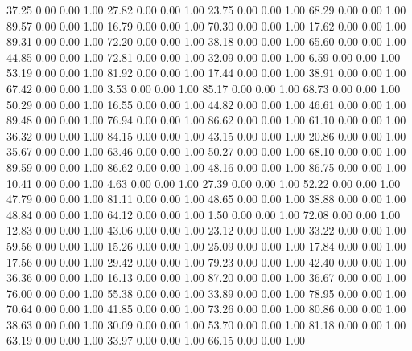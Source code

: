   37.25   0.00   0.00   1.00
   27.82   0.00   0.00   1.00
   23.75   0.00   0.00   1.00
   68.29   0.00   0.00   1.00
   89.57   0.00   0.00   1.00
   16.79   0.00   0.00   1.00
   70.30   0.00   0.00   1.00
   17.62   0.00   0.00   1.00
   89.31   0.00   0.00   1.00
   72.20   0.00   0.00   1.00
   38.18   0.00   0.00   1.00
   65.60   0.00   0.00   1.00
   44.85   0.00   0.00   1.00
   72.81   0.00   0.00   1.00
   32.09   0.00   0.00   1.00
    6.59   0.00   0.00   1.00
   53.19   0.00   0.00   1.00
   81.92   0.00   0.00   1.00
   17.44   0.00   0.00   1.00
   38.91   0.00   0.00   1.00
   67.42   0.00   0.00   1.00
    3.53   0.00   0.00   1.00
   85.17   0.00   0.00   1.00
   68.73   0.00   0.00   1.00
   50.29   0.00   0.00   1.00
   16.55   0.00   0.00   1.00
   44.82   0.00   0.00   1.00
   46.61   0.00   0.00   1.00
   89.48   0.00   0.00   1.00
   76.94   0.00   0.00   1.00
   86.62   0.00   0.00   1.00
   61.10   0.00   0.00   1.00
   36.32   0.00   0.00   1.00
   84.15   0.00   0.00   1.00
   43.15   0.00   0.00   1.00
   20.86   0.00   0.00   1.00
   35.67   0.00   0.00   1.00
   63.46   0.00   0.00   1.00
   50.27   0.00   0.00   1.00
   68.10   0.00   0.00   1.00
   89.59   0.00   0.00   1.00
   86.62   0.00   0.00   1.00
   48.16   0.00   0.00   1.00
   86.75   0.00   0.00   1.00
   10.41   0.00   0.00   1.00
    4.63   0.00   0.00   1.00
   27.39   0.00   0.00   1.00
   52.22   0.00   0.00   1.00
   47.79   0.00   0.00   1.00
   81.11   0.00   0.00   1.00
   48.65   0.00   0.00   1.00
   38.88   0.00   0.00   1.00
   48.84   0.00   0.00   1.00
   64.12   0.00   0.00   1.00
    1.50   0.00   0.00   1.00
   72.08   0.00   0.00   1.00
   12.83   0.00   0.00   1.00
   43.06   0.00   0.00   1.00
   23.12   0.00   0.00   1.00
   33.22   0.00   0.00   1.00
   59.56   0.00   0.00   1.00
   15.26   0.00   0.00   1.00
   25.09   0.00   0.00   1.00
   17.84   0.00   0.00   1.00
   17.56   0.00   0.00   1.00
   29.42   0.00   0.00   1.00
   79.23   0.00   0.00   1.00
   42.40   0.00   0.00   1.00
   36.36   0.00   0.00   1.00
   16.13   0.00   0.00   1.00
   87.20   0.00   0.00   1.00
   36.67   0.00   0.00   1.00
   76.00   0.00   0.00   1.00
   55.38   0.00   0.00   1.00
   33.89   0.00   0.00   1.00
   78.95   0.00   0.00   1.00
   70.64   0.00   0.00   1.00
   41.85   0.00   0.00   1.00
   73.26   0.00   0.00   1.00
   80.86   0.00   0.00   1.00
   38.63   0.00   0.00   1.00
   30.09   0.00   0.00   1.00
   53.70   0.00   0.00   1.00
   81.18   0.00   0.00   1.00
   63.19   0.00   0.00   1.00
   33.97   0.00   0.00   1.00
   66.15   0.00   0.00   1.00
